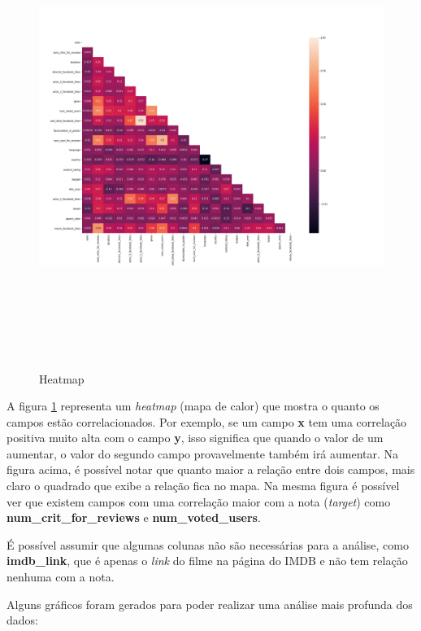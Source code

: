 \begin{figure}[H]
\centering
\includegraphics[height=15cm]{imagens/heatmap.png}
\caption{Heatmap}
\label{heatmap}
\end{figure}

A figura \ref{heatmap} representa um \textit{heatmap} (mapa de calor) que mostra o quanto os campos estão correlacionados. Por exemplo, se um campo \textbf{x} tem uma correlação positiva muito alta com o campo \textbf{y}, isso significa que quando o valor de um aumentar, o valor do segundo campo provavelmente também irá aumentar. Na figura acima, é possível notar que quanto maior a relação entre dois campos, mais claro o quadrado que exibe a relação fica no mapa. 
Na mesma figura é possível ver que existem campos com uma correlação maior com a nota (\textit{target}) como \textbf{num\_crit\_for\_reviews} e \textbf{num\_voted\_users}. 

É possível assumir que algumas colunas não são necessárias para a análise, como \textbf{imdb\_link}, que é apenas o \textit{link} do filme na página do IMDB e não tem relação nenhuma com a nota.

Alguns gráficos foram gerados para poder realizar uma análise mais profunda dos dados: 

